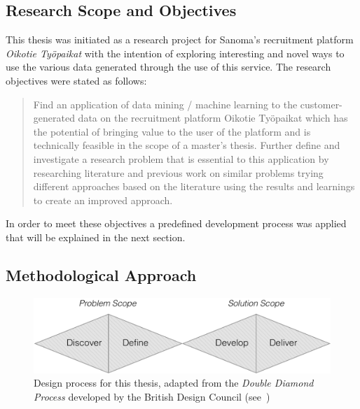 \subsection{Research Scope and Objectives}
\label{sub:Research Scope and Objectives}

This thesis was initiated as a research project for Sanoma's recruitment platform \emph{Oikotie Työpaikat} with the intention of exploring interesting and novel ways to use the various data generated through the use of this service. The research objectives were stated as follows:

\blockquote{Find an application of data mining / machine learning to the customer-generated data on the recruitment platform Oikotie Työpaikat which has the potential of bringing value to the user of the platform and is technically feasible in the scope of a master’s thesis. Further define and investigate a research problem that is essential to this application by researching literature and previous work on similar problems trying different approaches based on the literature using the results and learnings to create an improved approach.}

In order to meet these objectives a predefined development process was applied that will be explained in the next section.

\subsection{Methodological Approach}
\label{sub:Methodological Approach}

\begin{figure}[h]
    \centering
    \includegraphics[width=\textwidth]{img/double-diamond.pdf}
    \caption{Design process for this thesis, adapted from the \emph{Double Diamond Process} developed by the British Design Council (see~\cite{Council:2007aa})}
\label{fig:double-diamond}
\end{figure}

